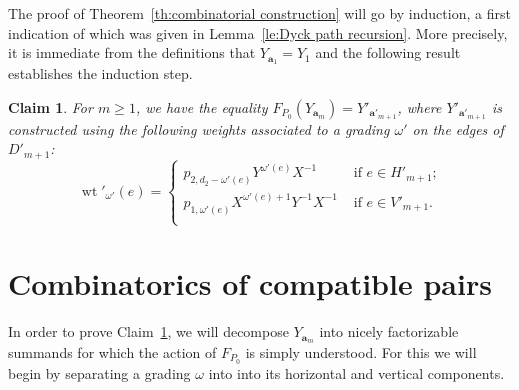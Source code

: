 \documentclass{amsart}
\newtheorem{claim}[theorem]{Claim}
\newcommand{\bfa}{\mathbf{a}}
\newcommand{\wt}{\operatorname{wt}}
\begin{document}
The proof of Theorem~\ref{th:combinatorial construction} will go by induction, a first indication of which was given in Lemma~\ref{le:Dyck path recursion}.  More precisely, it is immediate from the definitions that $Y_{\bfa_1}=Y_1$ and the following result establishes the induction step.
\begin{claim}\label{cl:combinatorial recursion}
  For $m\ge1$, we have the equality $F_{P_0}(Y_{\bfa_m})=Y'_{\bfa'_{m+1}}$, where $Y'_{\bfa'_{m+1}}$ is constructed using the following weights associated to a grading $\omega'$ on the edges of $D'_{m+1}$:
  \begin{equation}\label{eq:edge weights}
    \wt'_{\omega'}(e)=\begin{cases}
                        p_{2,d_2-\omega'(e)}Y^{\omega'(e)}X^{-1} & \text{ if $e\in H'_{m+1}$;}\\
                        p_{1,\omega'(e)}X^{\omega'(e)+1}Y^{-1}X^{-1} & \text{ if $e\in V'_{m+1}$.}\\
                      \end{cases}
  \end{equation}
\end{claim}


\section{Combinatorics of compatible pairs} 

In order to prove Claim~\ref{cl:combinatorial recursion}, we will decompose $Y_{\bfa_m}$ into nicely factorizable summands for which the action of $F_{P_0}$ is simply understood.  For this we will begin by separating a grading $\omega$ into into its horizontal and vertical components.
\end{document}
